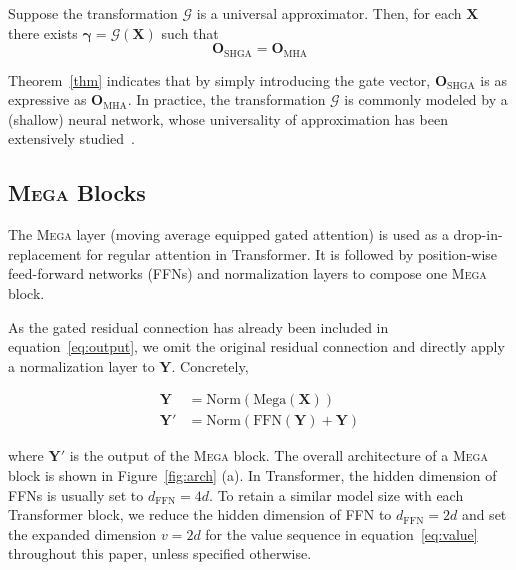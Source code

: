 \begin{theorem}\label{thm}
Suppose the transformation $\mathcal{G}$ is a universal approximator. Then, for each $\boldsymbol{X}$ there exists $\boldsymbol{\gamma} = \mathcal{G}(\boldsymbol{X})$ such that 
\begin{equation}
\boldsymbol{O}_{\mathrm{SHGA}} = \boldsymbol{O}_{\mathrm{MHA}}
\end{equation}
\end{theorem}

Theorem~\ref{thm} indicates that by simply introducing the gate vector, $\boldsymbol{O}_{\mathrm{SHGA}}$ is as expressive as $\boldsymbol{O}_{\mathrm{MHA}}$. 
In practice, the transformation $\mathcal{G}$ is commonly modeled by a (shallow) neural network, whose universality of approximation has been extensively studied~\citep{hornik1989multilayer,yarotsky2017error,park2020minimum}.

\subsection{\textsc{Mega} Blocks}
\label{subsec:mega_layer}

The \textsc{Mega} layer (moving average equipped gated attention) is used as a drop-in-replacement for regular attention in Transformer. It is followed by position-wise feed-forward networks (FFNs) and normalization layers to compose one \textsc{Mega} block.

As the gated residual connection has already been included in equation~\ref{eq:output}, we omit the original residual connection and directly apply a normalization layer to $\boldsymbol{Y}.$
Concretely,

\begin{align}
\boldsymbol{Y} & = \mathrm{Norm}(\mathrm{Mega}(\boldsymbol{X})) \nonumber \\
\boldsymbol{Y}' & = \mathrm{Norm}(\mathrm{FFN}(\boldsymbol{Y}) + \boldsymbol{Y})
\end{align}

where $\boldsymbol{Y}'$ is the output of the \textsc{Mega} block. The overall architecture of a \textsc{Mega} block is shown in Figure~\ref{fig:arch} (a). In Transformer, the hidden dimension of FFNs is usually set to $d_{\mathrm{FFN}} = 4d$. To retain a similar model size with each Transformer block, we reduce the hidden dimension of FFN to $d_{\mathrm{FFN}} = 2d$ and set the expanded dimension $v=2d$ for the value sequence in equation~\ref{eq:value} throughout this paper, unless specified otherwise.

